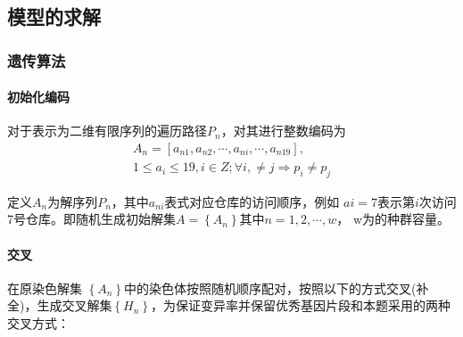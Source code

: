 \documentclass{whutmod}
\begin{document}
        \subsection{模型的求解}
        \subsubsection{遗传算法}
        \paragraph{初始化编码}
        对于表示为二维有限序列的遍历路径$P_n$，对其进行整数编码为
        \begin{gather*}
        A_n=[a_{n1},a_{n2},\cdots,a_{ni},\cdots,a_{n19}], \\
        1\leqslant a_i \leqslant 19 ,i\in Z ;\forall i, \neq j\Rightarrow p_i \neq p_j 
        \end{gather*}
        
        定义$A_n$为解序列$P_{n}$，其中$a_{ni}$表式对应仓库的访问顺序，例如 $a{i}=7$表示第$i$次访问7号仓库。即随机生成初始解集$A=\left \{A_n\right \}$其中$n=1,2,\cdots,w$， w为的种群容量。
        
        \paragraph{交叉}
        在原染色解集 $\left \{ A_n \right \}$中的染色体按照随机顺序配对，按照以下的方式交叉(补全)，生成交叉解集$\left \{H_n\right \}$，为保证变异率并保留优秀基因片段和本题采用的两种交叉方式：
        
\end{document}
